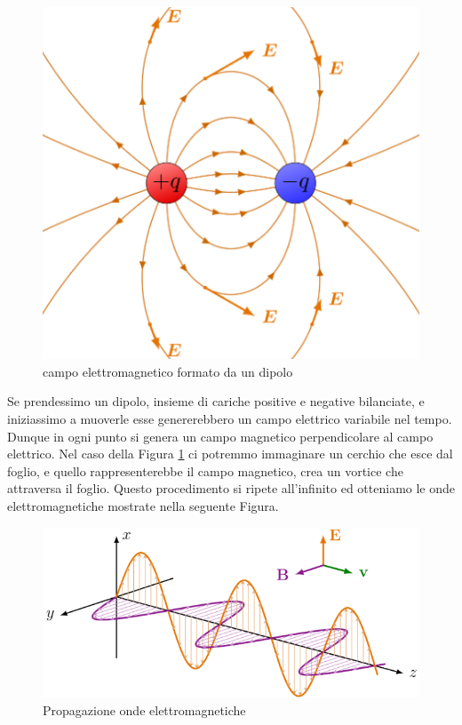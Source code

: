 \begin{figure}[H]
    \centering
    \includegraphics[scale = 0.4]{image/dipolo.png}
    \caption{campo elettromagnetico formato da un dipolo}
    \label{OndeElettrtomagnetiche}
\end{figure}

Se prendessimo un dipolo, insieme di cariche positive e negative bilanciate, e iniziassimo a muoverle esse genererebbero un campo elettrico variabile nel tempo. Dunque in ogni punto si genera un campo magnetico perpendicolare al campo elettrico. Nel caso della Figura \ref{OndeElettrtomagnetiche} ci potremmo immaginare un cerchio che esce dal foglio, e quello rappresenterebbe il campo magnetico, crea un vortice che attraversa il foglio. Questo procedimento si ripete all'infinito ed otteniamo le onde elettromagnetiche mostrate nella seguente Figura.

\begin{figure}[h]
    \centering
    \includegraphics[scale=0.5]{image/ondeElettomagnetiche.png}
    \caption{Propagazione onde elettromagnetiche}
    \label{OndeElettromagentiche}
\end{figure}


